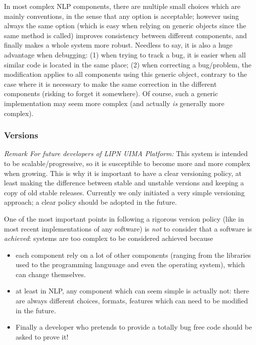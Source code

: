\documentclass{article}
\newcommand{\softName}{{\em LIPN UIMA Platform}\xspace}
\newenvironment{xitemize}{
\begin{itemize}
  \setlength{\itemsep}{.3\baselineskip}
  \setlength{\topsep}{0pt}
  \setlength{\parskip}{0pt}
  \setlength{\parsep}{0pt}
}{\end{itemize}}
\begin{document}
In most complex NLP components, there are multiple small choices which are mainly conventions, in the sense that any option is acceptable; however using always the same option (which is easy when relying on generic objects since the same method is called) improves consistency between different components, and finally makes a whole system more robust. Needless to say, it is also a huge advantage when debugging: (1) when trying to track a bug, it is easier when all similar code is located in the same place; (2) when correcting a bug/problem, the modification applies to all components using this generic object, contrary to the case where it is necessary to make the same correction in the different components (risking to forget it somewhere). Of course, such a generic implementation may seem more complex (and actually {\em is} generally more complex).



\subsubsection{Versions}

{\em Remark For future developers of \softName:} This system is intended to be scalable/progressive, so it is susceptible to become more and more complex when growing. This is why it is important to have a clear versioning policy, at least making the difference between stable and unstable versions and keeping a copy of old stable releases. Currently we only initiated a very simple versioning approach; a clear policy should be adopted in the future.

One of the most important points in following a rigorous version policy (like in most recent implementations of any software) is {\em not} to consider that a software is {\em achieved}: systems are too complex to be considered achieved because
\begin{xitemize}
\item each component rely on a lot of other components (ranging from the libraries used to the programming languuage and even the operating system), which can change themselves. 
\item at least in NLP, any component which can seem simple is actually not: there are always different choices, formats, features which can need to be modified in the future.
\item Finally a developer who pretends to provide a totally bug free code should be asked to prove it!
\end{xitemize}
\end{document}

